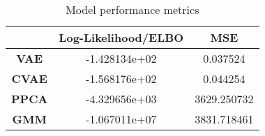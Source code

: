 \begin{table}
\centering
\caption{Model performance metrics}
\label{table:metrics}
\begin{tabular}{ccc}
\toprule
{} &  \textbf{Log-Likelihood/ELBO} &  \textbf{MSE} \\
\midrule
\textbf{VAE } &                 -1.428134e+02 &      0.037524 \\
\textbf{CVAE} &                 -1.568176e+02 &      0.044254 \\
\textbf{PPCA} &                 -4.329656e+03 &   3629.250732 \\
\textbf{GMM } &                 -1.067011e+07 &   3831.718461 \\
\bottomrule
\end{tabular}
\end{table}
